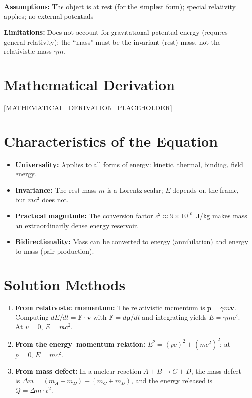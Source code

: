 \documentclass[11pt,openright]{book}
\begin{document}
\textbf{Assumptions:} The object is at rest (for the simplest form); special relativity applies; no external potentials.


\textbf{Limitations:} Does not account for gravitational potential energy (requires general relativity); the ``mass'' must be the invariant (rest) mass, not the relativistic mass $\gamma m$.


\section*{Mathematical Derivation}

[MATHEMATICAL_DERIVATION_PLACEHOLDER]

\section*{Characteristics of the Equation}

\begin{itemize}
  \item \textbf{Universality:} Applies to all forms of energy: kinetic, thermal, binding, field energy.
  \item \textbf{Invariance:} The rest mass $m$ is a Lorentz scalar; $E$ depends on the frame, but $mc^{2}$ does not.
  \item \textbf{Practical magnitude:} The conversion factor $c^{2} \approx 9 \times 10^{16}$~J/kg makes mass an extraordinarily dense energy reservoir.
  \item \textbf{Bidirectionality:} Mass can be converted to energy (annihilation) and energy to mass (pair production).
\end{itemize}
\section*{Solution Methods}

\begin{enumerate}
  \item \textbf{From relativistic momentum:} The relativistic momentum is $\mathbf{p} = \gamma m\mathbf{v}$. Computing $dE/dt = \mathbf{F}\cdot\mathbf{v}$ with $\mathbf{F} = d\mathbf{p}/dt$ and integrating yields $E = \gamma mc^{2}$. At $v = 0$, $E = mc^{2}$.
  \item \textbf{From the energy--momentum relation:} $E^{2} = (pc)^{2} + (mc^{2})^{2}$; at $p = 0$, $E = mc^{2}$.
  \item \textbf{From mass defect:} In a nuclear reaction $A + B \to C + D$, the mass defect is $\Delta m = (m_{A} + m_{B}) - (m_{C} + m_{D})$, and the energy released is $Q = \Delta m \cdot c^{2}$.
\end{enumerate}
\end{document}
